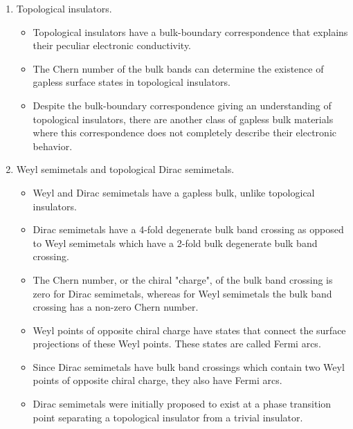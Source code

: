 \documentclass[english]{revtex4-1}
\begin{document}
\begin{enumerate}
    \item Topological insulators.

    \begin{itemize}
    
        \item Topological insulators have a bulk-boundary correspondence that explains their peculiar electronic conductivity. 
        
        \item The Chern number of the bulk bands can determine the existence of gapless surface states in topological insulators.
        
        \item Despite the bulk-boundary correspondence giving an understanding of topological insulators, there are another class of gapless bulk materials where this correspondence does not completely describe their electronic behavior.  
    
    \end{itemize}
    
    \item Weyl semimetals and topological Dirac semimetals.
    
    \begin{itemize}
    
        \item Weyl and Dirac semimetals have a gapless bulk, unlike topological insulators.  
    
        \item Dirac semimetals have a 4-fold degenerate bulk band crossing as opposed to Weyl semimetals which have a 2-fold bulk degenerate bulk band crossing.
        
        \item The Chern number, or the chiral "charge", of the bulk band crossing is zero for Dirac semimetals, whereas for Weyl semimetals the bulk band crossing has a non-zero Chern number.
        
        \item Weyl points of opposite chiral charge have states that connect the surface projections of these Weyl points.  These states are called Fermi arcs.
        
        \item Since Dirac semimetals have bulk band crossings which contain two Weyl points of opposite chiral charge, they also have Fermi arcs.  
        
        \item Dirac semimetals were initially proposed to exist at a phase transition point separating a topological insulator from a trivial insulator.
        

\end{itemize}
\end{enumerate}
\end{document}
